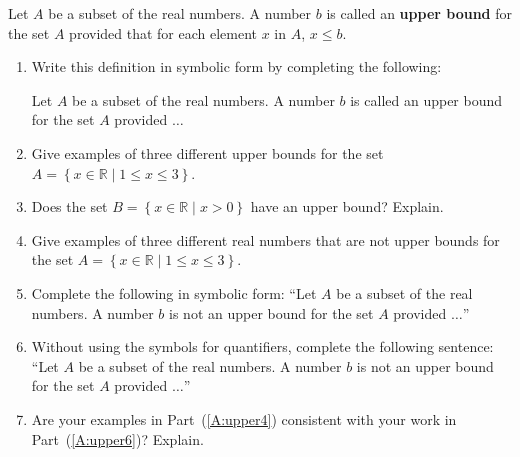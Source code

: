 \begin{activity}\label{A:upper}
Let  $A$  be a subset of the real numbers.  A number  $b$  is called an \textbf{upper bound} for the set  $A$ provided that for each element  $x$  in $A$, $x \leq b$.

\begin{enumerate}
  \item Write this definition in symbolic form by completing the following:

Let  $A$  be a subset of the real numbers.  A number  $b$  is called an upper bound for the set  $A$ provided $ \ldots $

  \item Give examples of three different upper bounds for the set \\ 
$A = \left\{ x \in \mathbb{R} \mid 1 \leq x \leq 3 \right\}$.

  \item Does the set  $B = \left\{ x \in \mathbb{R} \mid x > 0 \right\}$ have an upper bound?  Explain.

  \item Give examples of three different real numbers that are not upper bounds for the set  
$A = \left\{ x \in \mathbb{R} \mid 1 \leq x \leq 3 \right\}$. \label{A:upper4}

  \item Complete the following in symbolic form:  ``Let  $A$  be a subset of the real numbers.  A number  $b$  is not an upper bound for the set  $A$   provided $ \ldots $''

  \item Without using the symbols for quantifiers, complete the following sentence:  ``Let  $A$  be a subset of the real numbers.  A number  $b$  is not an upper bound for the set  $A$ provided $ \ldots $''  \label{A:upper6}

  \item Are your examples in Part~(\ref{A:upper4}) consistent with your work in Part~(\ref{A:upper6})?  Explain.
\end{enumerate}
\hbreak
\end{activity}
%
